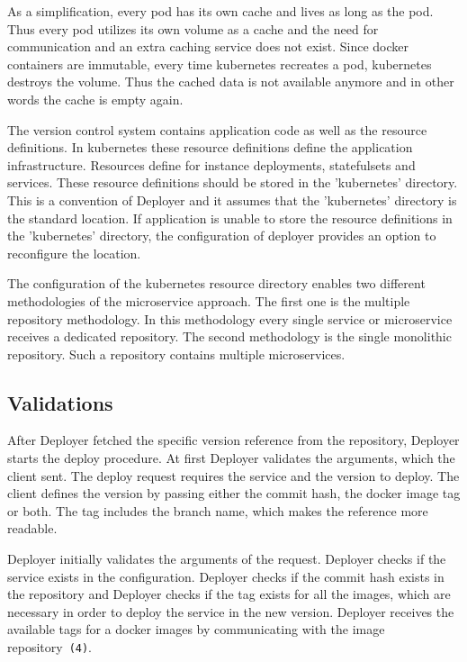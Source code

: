 As a simplification, every pod has its own cache and lives as long as the pod. Thus every
pod utilizes its own volume as a cache and the need for communication and an extra caching
service does not exist. Since docker containers are immutable, every time kubernetes
recreates a pod, kubernetes destroys the volume. Thus the cached data is not available
anymore and in other words the cache is empty again.

The version control system contains application code as well as the resource
definitions. In kubernetes these resource definitions define the application
infrastructure. Resources define for instance deployments, statefulsets and
services. These resource definitions should be stored in the 'kubernetes' directory. This
is a convention of Deployer and it assumes that the 'kubernetes' directory is the standard
location. If application is unable to store the resource definitions in the 'kubernetes'
directory, the configuration of deployer provides an option to reconfigure the location.

The configuration of the kubernetes resource directory enables two different methodologies
of the microservice approach. The first one is the multiple repository methodology. In
this methodology every single service or microservice receives a dedicated repository.
The second methodology is the single monolithic repository. Such a repository contains
multiple microservices.

\subsection{Validations}

After Deployer fetched the specific version reference from the repository, Deployer starts
the deploy procedure. At first Deployer validates the arguments, which the client
sent. The deploy request requires the service and the version to deploy. The client
defines the version by passing either the commit hash, the docker image tag or both. The
tag includes the branch name, which makes the reference more readable.

Deployer initially validates the arguments of the request. Deployer checks if the service
exists in the configuration. Deployer checks if the commit hash exists in the repository
and Deployer checks if the tag exists for all the images, which are necessary in order to
deploy the service in the new version. Deployer receives the available tags for a docker
images by communicating with the image repository~\texttt{(4)}.

